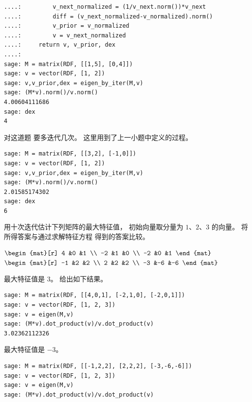 \begin{exercises}
\begin{answer}
\begin{exparts}
\begin{lstlisting}
....:         v_next_normalized = (1/v_next.norm())*v_next
....:         diff = (v_next_normalized-v_normalized).norm()
....:         v_prior = v_normalized
....:         v = v_next_normalized
....:     return v, v_prior, dex
....:
sage: M = matrix(RDF, [[1,5], [0,4]])
sage: v = vector(RDF, [1, 2])
sage: v,v_prior,dex = eigen_by_iter(M,v)
sage: (M*v).norm()/v.norm()
4.00604111686
sage: dex
4
 \end{lstlisting}
      \partsitem 对这道题 \Sage{} 要多迭代几次。
        这里用到了上一小题中定义的过程。
\begin{lstlisting}
sage: M = matrix(RDF, [[3,2], [-1,0]])
sage: v = vector(RDF, [1, 2])
sage: v,v_prior,dex = eigen_by_iter(M,v)
sage: (M*v).norm()/v.norm()
2.01585174302
sage: dex
6
\end{lstlisting}
       \end{exparts}
     \end{answer}
  \item
    用十次迭代估计下列矩阵的最大特征值，
    初始向量取分量为 $1$、$2$、$3$ 的向量。
    将所得答案与通过求解特征方程
    得到的答案比较。
    \begin{exparts*}
      \partsitem $\begin{mat}[r]
                    4   &0  &1 \\
                    -2  &1  &0  \\
                    -2  &0  &1
                  \end{mat}$
      \partsitem $\begin{mat}[r]
                   -1  &2  &2  \\
                    2  &2  &2  \\
                   -3  &-6 &-6
                  \end{mat}$
    \end{exparts*}
    \begin{answer}
     \begin{exparts}
       \partsitem 最大特征值是 $3$。
         \Sage{} 给出如下结果。
\begin{lstlisting}
sage: M = matrix(RDF, [[4,0,1], [-2,1,0], [-2,0,1]])
sage: v = vector(RDF, [1, 2, 3])
sage: v = eigen(M,v)
sage: (M*v).dot_product(v)/v.dot_product(v)
3.02362112326
\end{lstlisting}
       \partsitem 最大特征值是 $-3$。
\begin{lstlisting}
sage: M = matrix(RDF, [[-1,2,2], [2,2,2], [-3,-6,-6]])
sage: v = vector(RDF, [1, 2, 3])
sage: v = eigen(M,v)
sage: (M*v).dot_product(v)/v.dot_product(v)

\end{lstlisting}
\end{exparts}
\end{answer}
\end{exercises}
